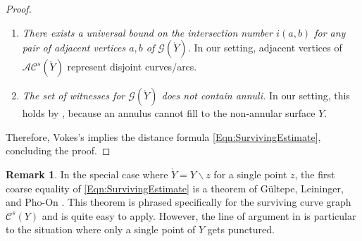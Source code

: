 \documentclass[11pt,letterpaper]{amsart}
\newcommand{\mc}{\mathcal}
\newcommand{\mr}{\mathring}
\numberwithin{equation}{section}
\theoremstyle{definition}
\newtheorem{remark}[theorem]{Remark}
\newcommand{\C}{\mathcal{C}}
\renewcommand{\setminus}{\smallsetminus}
\newcommand{\AC}{\mathcal{AC}}
\begin{document}
\begin{proof}
\begin{enumerate}
\smallskip
\item \emph{There exists a universal bound on the intersection number $i(a,b)$ for any pair of adjacent vertices $a, b$ of $\mc G(\mr Y)$.} In our setting, adjacent vertices of $\AC^s(\mr Y)$ represent disjoint curves/arcs.

\smallskip
\item \emph{The set of witnesses for $\mc G(\mr Y)$ does not contain annuli.} In our setting, this holds by , because an annulus cannot fill to the non-annular surface $Y$.
\end{enumerate}

Therefore, Vokes's  \cite[Corollary 1.2]{Vokes} implies the distance formula \eqref{Eqn:SurvivingEstimate}, concluding the proof.
\end{proof}


\begin{remark}
 In the special case where $\mr Y = Y \setminus z$ for a single point $z$, the first coarse equality of \eqref{Eqn:SurvivingEstimate} is a theorem of G\"ultepe, Leininger, and Pho-On \cite[Theorem 5.1]{GultepeLeiningerPhoOn}. This theorem is phrased specifically for the surviving curve graph $\C^s(Y)$ and is quite easy to apply. However, the line of argument in \cite{GultepeLeiningerPhoOn} is particular to the situation where only a single point of $Y$ gets punctured.
\end{remark}
\end{document}

